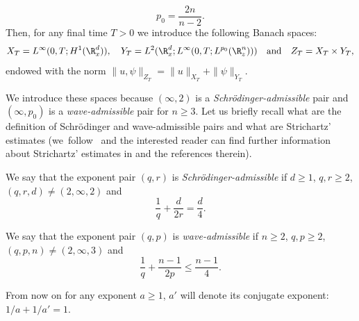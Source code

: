 \begin{equation}
\label{p0}p_{0}=\frac{2n}{n-2}.
\end{equation}
Then, for any final time $T>0$ we introduce the following Banach spaces:
\[
X_{T}=L^{\infty}(0,T;H^{1}(\R_{x}^{d})),\quad Y_{T}=L^{2}(\R_{x}^{d};L^{\infty}(0,T;L^{p_{0}}(\R_{z}^{n})))\quad\text{and}\quad Z_{T}=X_{T}\times Y_{T},
\]
endowed with the norm $\|u,\psi\|_{Z_{T}}=\|u\|_{X_{T}}+\|\psi\|_{Y_{T}}$.

We introduce these spaces because $(\infty,2)$ is a \emph{Schrödinger-admissible} pair and $(\infty,p_{0})$ is a \emph{wave-admissible} pair for $n\geq 3$. Let us briefly recall what are the definition of Schrödinger and wave-admissible pairs and what are Strichartz' estimates (we~follow~\cite{MT} and the interested reader can find further information about Strichartz' estimates in \cite{Ginibre_Velo_Strichartz} and the references therein).

\skpt
\begin{defin}
\begin{enumeratei}
\item
We say that the exponent pair $(q,r)$ is \emph{Schrödinger-admissible} if $d\geq 1$, $q,r\geq 2$, $(q,r,d)\neq(2,\infty,2)$ and
\[
\frac{1}{q}+\frac{d}{2r}=\frac{d}{4}.
\]
\item
We say that the exponent pair $(q,p)$ is \emph{wave-admissible} if $n\geq 2$, $q,p\geq 2$, $(q,p,n)\neq(2,\infty,3)$ and
\[
\frac{1}{q}+\frac{n-1}{2p}\leq\frac{n-1}{4}.
\]
\end{enumeratei}
\end{defin}

From now on for any exponent $a\geq 1$, $a'$ will denote its conjugate exponent: $1/a+1/a'=1$.

